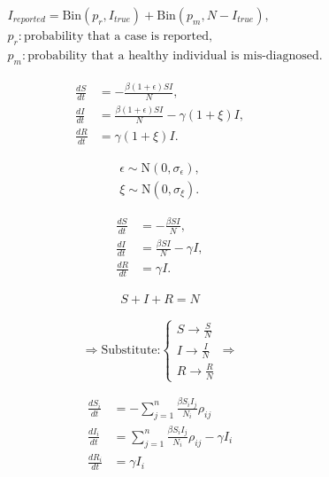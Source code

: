 \documentclass[14pt]{extarticle}
\begin{document}
	
	
	\newpage
	
	
	\begin{align*} 
	&I_{reported} = \mbox{Bin}(p_r,I_{true}) + \mbox{Bin}(p_m,N-I_{true}),\\[0.5em]
	&p_r : \text{probability that a case is reported,}\\
	&p_m : \text{probability that a healthy individual is mis-diagnosed.}
	\end{align*}
	
	\newpage
	
	\begin{align*}
	\frac{dS}{dt} &= -\frac{\beta(1+\epsilon) SI}{N},\\[0.5em]
	\frac{dI}{dt} &= \frac{\beta(1+\epsilon) SI}{N} - \gamma(1+\xi) I,\\[0.5em]
	\frac{dR}{dt} &= \gamma(1+\xi) I.
	\end{align*}
	
	\begin{align*}
	\epsilon \sim \mbox{N}(0,\sigma_{\epsilon}),\\
	\xi \sim \mbox{N}(0,\sigma_{\xi}).
	\end{align*}
	
	\newpage
	
	\begin{align*}
	\frac{dS}{dt} &= -\frac{\beta SI}{N},\\[0.5em]
	\frac{dI}{dt} &= \frac{\beta SI}{N} - \gamma I,\\[0.5em]
	\frac{dR}{dt} &= \gamma I.
	\end{align*}
	
	\begin{align*}
	S + I + R = N
	\end{align*}
	
	\newpage
	
	\begin{equation*}
	\Longrightarrow\text{Substitute:} \begin{cases}
	S \rightarrow \frac{S}{N}\\
	I \rightarrow \frac{I}{N}\\
	R \rightarrow \frac{R}{N}
	\end{cases}
	\Longrightarrow
	\end{equation*}
	
	\newpage
	
	\begin{align*}
	\frac{dS_i}{dt} &= -\sum_{j=1}^{n}\frac{\beta S_iI_j}{N_i}\rho_{ij}\\[0.5em]
	\frac{dI_i}{dt} &= \sum_{j=1}^{n}\frac{\beta S_iI_j}{N_i}\rho_{ij} - \gamma I_i\\[0.5em]
	\frac{dR_i}{dt} &= \gamma I_i \\[0.5em]
	\end{align*}
	
\end{document}
